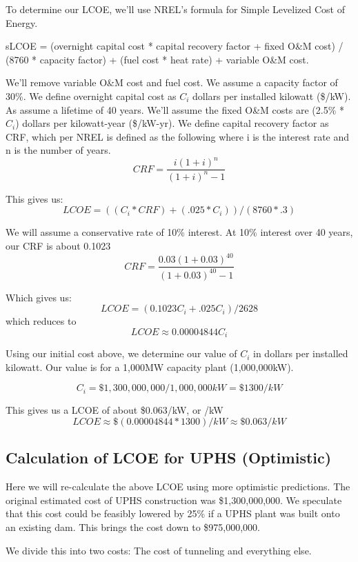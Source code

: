To determine our LCOE, we'll use NREL's formula for Simple Levelized Cost of Energy.

\begin{displayquote}
sLCOE = {(overnight capital cost * capital recovery factor + fixed O\&M cost) / (8760 * capacity factor)} + (fuel cost * heat rate) + variable O\&M cost. \cite{SimpleLevelizedCostOfEnergyCalculator}
\end{displayquote}

We'll remove variable O\&M cost and fuel cost. We assume a capacity factor of 30\%. We define overnight capital cost as $C_i$ dollars per installed kilowatt (\$/kW). As assume a lifetime of 40 years. We'll assume the fixed O\&M costs are (2.5\% * $C_i$) dollars per kilowatt-year (\$/kW-yr). We define capital recovery factor as CRF, which per NREL is defined as the following where i is the interest rate and n is the number of years.
\[ \displaystyle CRF={\frac {i(1+i)^{n}}{(1+i)^{n}-1}} \]

This gives us:
\[ LCOE = ((C_i * CRF) + (.025 * C_i)) / (8760 * .3) \]

We will assume a conservative rate of 10\% interest. At 10\% interest over 40 years, our CRF is about 0.1023
\[ \displaystyle CRF={\frac {0.03(1+0.03)^{40}}{(1+0.03)^{40}-1}} \]

Which gives us:
\[ LCOE = (0.1023C_i + .025C_i) / 2628 \]
which reduces to
\[ LCOE \approx 0.00004844 C_i \]

Using our initial cost above, we determine our value of $C_i$ in dollars per installed kilowatt. Our value is for a 1,000MW capacity plant (1,000,000kW).

\[ C_i = \$1,300,000,000 / 1,000,000kW = \$1300/kW\]

This gives us a LCOE of about \$0.063/kW, or /kW
\[ LCOE \approx \$(0.00004844 * 1300)/kW \approx \$0.063/kW \]


\subsection{Calculation of LCOE for UPHS (Optimistic)}
Here we will re-calculate the above LCOE using more optimistic predictions. The original estimated cost of UPHS construction was \$1,300,000,000. We speculate that this cost could be feasibly lowered by 25\% if a UPHS plant was built onto an existing dam. This brings the cost down to \$975,000,000.

We divide this into two costs: The cost of tunneling and everything else.

